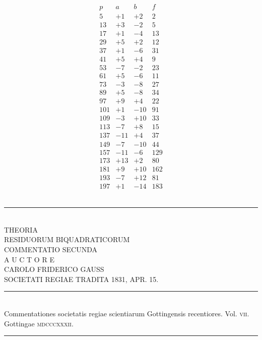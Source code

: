 \documentclass[twoside,12pt]{memoir}
\begin{document}
\[\begin{array}{r|r|r|r}
p & a & b & f \\
\hline
5 & +1 & +2 & 2 \\
13 & +3 & -2 & 5 \\
17 & +1& -4 & 13 \\
29 & +5 & +2 & 12 \\
37 & +1 & -6 & 31 \\
41 & +5 & +4 & 9 \\
53 & -7 & -2 & 23 \\
61 & +5 & -6 & 11 \\
73 & -3 & -8 & 27 \\
89 & +5 & -8 & 34 \\
97 & +9 & +4 & 22 \\
101 & +1 & -10 & 91 \\
109 & -3 & +10 & 33 \\
113 & -7 & +8 & 15 \\
137 & -11 & +4 & 37 \\
149 & -7 & -10 & 44 \\
157 & -11 & -6 & 129 \\
173 & +13 & +2 & 80 \\
181 & +9 & +10 & 162 \\
193 & -7 & +12 & 81 \\
197 & +1 & -14 & 183 
\end{array}\]\\[\baselineskip]
\begin{center} 
\rule{2in}{0.5pt}
\end{center}
\pagebreak%

\begin{center}
\;\\[4\baselineskip]
{\large THEORIA  }\\[\baselineskip]
{\LARGE RESIDUORUM BIQUADRATICORUM }\\[3\baselineskip]
{\large COMMENTATIO SECUNDA}\\[2.5\baselineskip]
{\tiny A U C T O R E}\\[1.5\baselineskip]
CAROLO FRIDERICO GAUSS\\[1.5\baselineskip]
{\scriptsize SOCIETATI REGIAE TRADITA {\tiny \textsc{1831},} APR. {\tiny \textsc{15}.}}\\[4\baselineskip]
\rule{4in}{0.5pt}\\[0.5\baselineskip]
{\small Commentationes societatis regiae scientiarum Gottingensis recentiores. Vol. \textsc{vii}.\\
Gottingae \textsc{mdcccxxxii}.}\\
\rule{4in}{0.5pt}
\end{center}
\pagebreak%
\;\pagebreak%
\end{document}
